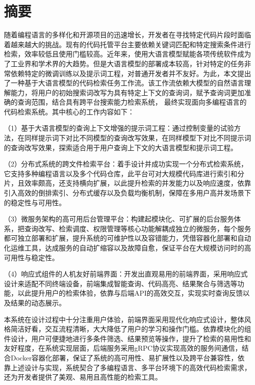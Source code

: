 \documentclass[UTF8,a4paper,12pt]{ctexart}
\numberwithin{equation}{section}
\begin{document}
\section*{摘\quad 要}
随着编程语言的多样化和开源项目的迅速增长，开发者在寻找特定代码片段时面临着越来越大的挑战。现有的代码托管平台主要依赖关键词匹配和特定搜索条件进行检索，效率较低且使用门槛较高。近年来，使用大语言模型赋能各项传统软件成为了工业界和学术界的大趋势。但是大语言模型的部署成本较高，针对特定的任务非常依赖特定的微调训练以及提示词工程，对普通开发者并不友好。为此，本文提出了一种基于大语言模型的代码检索任务工作流。该工作流依赖大模型的自然语言理解能力，将用户的初始搜索词改写为具有特定上下文的查询词，赋予查询词更加准确的查询范围，结合具有跨平台搜索能力检索系统， 最终实现面向多编程语言的代码检索系统。其中核心的工作内容如下：\par
（1）基于大语言模型的查询上下文增强的提示词工程：通过控制变量的试验方法，在同样提示词下对比不同模型的查询改写效果，在同样模型下对比不同提示词的查询改写效果，探索适合用于用户查询上下文的大语言模型和提示词工程。\par
（2）分布式系统的跨文件检索平台：着手设计并成功实现一个分布式检索系统，它支持多种编程语言以及多个代码仓库，此平台可对大规模代码库进行索引和分片，且效率颇高，还支持横向扩展，以此提升检索的并发能力以及响应速度，依靠引入高效的倒排索引、分布式缓存以及负载均衡机制，保障在多用户高并发场景下的稳定性与可用性。\par
（3）微服务架构的高可用后台管理平台：构建起模块化、可扩展的后台服务体系，把查询改写、检索调度、权限管理等核心功能解耦成独立的微服务，每个服务都可独立部署和扩展，提升系统的可维护性以及容错能力，凭借容器化部署和自动化运维工具，达成服务的自动扩缩容以及故障自愈，保证平台在大规模访问时的高可用性与稳定性。\par
（4）响应式组件的人机友好前端界面：开发出直观易用的前端界面，采用响应式设计来适配不同终端设备，前端集成智能查询、代码高亮、结果聚合与筛选等功能，以此提升用户的检索体验，依靠与后端API的高效交互，实现实时查询反馈以及结果的动态展示。\par
本系统在设计过程中十分注重用户体验，前端界面采用现代化响应式设计，整体风格简洁好看，交互流程清晰，大大降低了用户的学习和操作门槛。依靠模块化的组件设计，用户可便捷地进行多条件筛选、结果预览等操作，提升了检索的易用性和友好程度，在系统实现层面，后端服务采用gRPC协议实现高效的服务间通信，结合Docker容器化部署，保证了系统的高可用性、易扩展性以及跨平台兼容性，依靠上述设计与实现，系统契合了多编程语言、多平台环境下的高效代码检索需求，还为开发者提供了美观、易用且高性能的检索工具。\par
\end{document}
